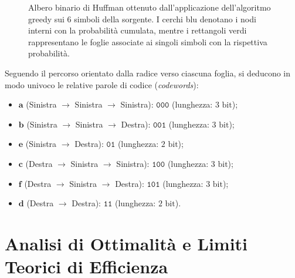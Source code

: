 \begin{figure}[H]
\caption{Albero binario di Huffman ottenuto dall'applicazione dell'algoritmo greedy sui 6 simboli della sorgente. I cerchi blu denotano i nodi interni con la probabilit\`a cumulata, mentre i rettangoli verdi rappresentano le foglie associate ai singoli simboli con la rispettiva probabilit\`a.}
\label{fig:albero-huffman-completo}
\end{figure}

Seguendo il percorso orientato dalla radice verso ciascuna foglia, si deducono in modo univoco le relative parole di codice (\textit{codewords}):
\begin{itemize}
  \item $\mathbf{a}$ (Sinistra $\to$ Sinistra $\to$ Sinistra): $\texttt{000}$ (lunghezza: $3\text{ bit}$);
  \item $\mathbf{b}$ (Sinistra $\to$ Sinistra $\to$ Destra): $\texttt{001}$ (lunghezza: $3\text{ bit}$);
  \item $\mathbf{e}$ (Sinistra $\to$ Destra): $\texttt{01}$ (lunghezza: $2\text{ bit}$);
  \item $\mathbf{c}$ (Destra $\to$ Sinistra $\to$ Sinistra): $\texttt{100}$ (lunghezza: $3\text{ bit}$);
  \item $\mathbf{f}$ (Destra $\to$ Sinistra $\to$ Destra): $\texttt{101}$ (lunghezza: $3\text{ bit}$);
  \item $\mathbf{d}$ (Destra $\to$ Destra): $\texttt{11}$ (lunghezza: $2\text{ bit}$).
\end{itemize}

\FloatBarrier
\section{Analisi di Ottimalit\`a e Limiti Teorici di Efficienza}
\label{sec:ottimalita-limiti-teorici}

